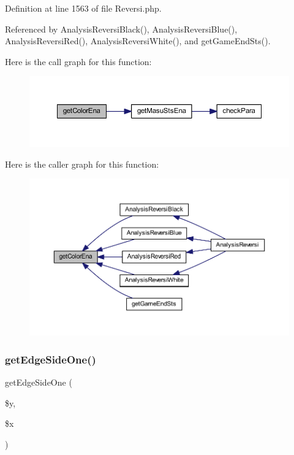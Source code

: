 Definition at line 1563 of file Reversi.\+php.



Referenced by Analysis\+Reversi\+Black(), Analysis\+Reversi\+Blue(), Analysis\+Reversi\+Red(), Analysis\+Reversi\+White(), and get\+Game\+End\+Sts().

Here is the call graph for this function\+:\nopagebreak
\begin{figure}[H]
\begin{center}
\leavevmode
\includegraphics[width=350pt]{class_reversi_aead5ee041feb6ac2609266614ea06f78_cgraph}
\end{center}
\end{figure}
Here is the caller graph for this function\+:\nopagebreak
\begin{figure}[H]
\begin{center}
\leavevmode
\includegraphics[width=350pt]{class_reversi_aead5ee041feb6ac2609266614ea06f78_icgraph}
\end{center}
\end{figure}
\mbox{\label{class_reversi_a98aff7f2db3a9feacbe98293c6b80eb4}} 
\subsubsection{\texorpdfstring{get\+Edge\+Side\+One()}{getEdgeSideOne()}}
{\footnotesize\ttfamily get\+Edge\+Side\+One (\begin{DoxyParamCaption}\item[{}]{\$y,  }\item[{}]{\$x }\end{DoxyParamCaption})}



